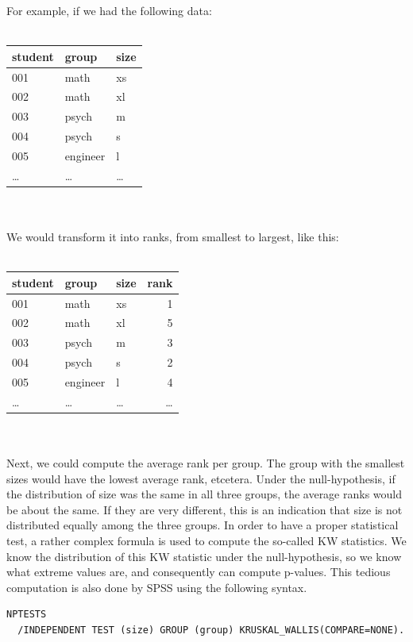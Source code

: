 \documentclass[]{report}\usepackage[]{graphicx}\usepackage[]{color}
\begin{document}
For example, if we had the following data:
\\
 \\
 \begin{tabular}{lll}
 student & group & size \\ \hline
 001 & math & xs \\
 002 & math & xl \\
 003 & psych & m \\
 004 & psych & s \\
 005 & engineer & l \\
 \dots & \dots & \dots \\
 \end{tabular}
\\
\\
We would transform it into ranks, from smallest to largest, like this:
\\
 \\
 \begin{tabular}{lllr}
 student & group & size & rank\\ \hline
 001 & math & xs & 1\\
 002 & math & xl & 5\\
 003 & psych & m & 3\\
 004 & psych & s & 2\\
 005 & engineer & l & 4 \\
 \dots & \dots & \dots & \dots \\
 \end{tabular}
\\
\\
Next, we could compute the average rank per group. The group with the smallest sizes would have the lowest average rank, etcetera. Under the null-hypothesis, if the distribution of size was the same in all three groups, the average ranks would be about the same. If they are very different, this is an indication that size is not distributed equally among the three groups. In order to have a proper statistical test, a rather complex formula is used to compute the so-called KW statistics. We know the distribution of this KW statistic under the null-hypothesis, so we know what extreme values are, and consequently can compute p-values. This tedious computation is also done by SPSS using the following syntax. 

\begin{verbatim}
NPTESTS 
  /INDEPENDENT TEST (size) GROUP (group) KRUSKAL_WALLIS(COMPARE=NONE).
\end{verbatim}
\end{document}
